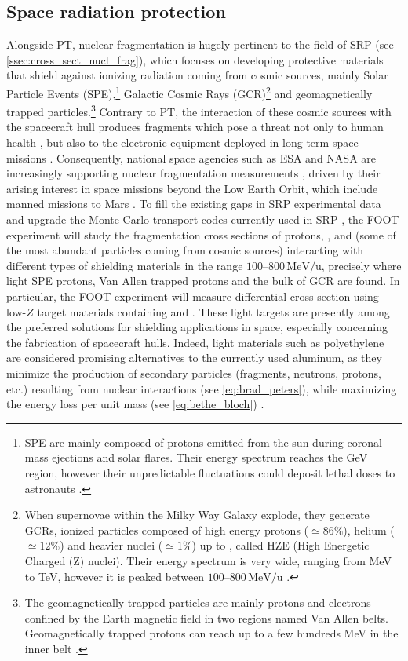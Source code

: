 \subsection{Space radiation protection}\label{ssec:space_radiation_protection}
Alongside PT, nuclear fragmentation is hugely pertinent to the field of SRP (see \autoref{ssec:cross_sect_nucl_frag}), which focuses on developing protective materials that shield against ionizing radiation coming from cosmic sources, mainly Solar Particle Events (SPE),\footnote{SPE are mainly composed of protons emitted from the sun during coronal mass ejections and solar flares. Their energy spectrum reaches the GeV region, however their unpredictable fluctuations could deposit lethal doses to astronauts \cite{measurement_impact_foot}.} Galactic Cosmic Rays (GCR)\footnote{When supernovae within the Milky Way Galaxy explode, they generate GCRs, ionized particles composed of high energy protons ($\simeq86\%$), helium ($\simeq12\%$) and heavier nuclei ($\simeq1\%$) up to , called HZE (High Energetic Charged (Z) nuclei). Their energy spectrum is very wide, ranging from MeV to TeV, however it is peaked between $100$--$800\,\mathrm{MeV/u}$ \cite{measurement_impact_foot}.} and geomagnetically trapped particles.\footnote{The geomagnetically trapped particles are mainly protons and electrons confined by the Earth magnetic field in two regions named Van Allen belts. Geomagnetically trapped protons can reach up to a few hundreds MeV in the inner belt \cite{measurement_impact_foot}.} Contrary to PT, the interaction of these cosmic sources with the spacecraft hull produces fragments which pose a threat not only to human health \cite{articleSustainableSpaceExploration}, but also to the electronic equipment deployed in long-term space missions \cite{RevModPhys.83.1245,wrbanek2020spaceradiation}. Consequently, national space agencies such as ESA and NASA are increasingly supporting nuclear fragmentation measurements \cite{Luoni2025}, driven by their arising interest in space missions beyond the Low Earth Orbit, which include manned missions to Mars \cite{DURANTE20142}. To fill the existing gaps in SRP experimental data \cite{Norbury2012} and upgrade the Monte Carlo transport codes currently used in SRP \cite{HEINBOCKEL20111079}, the FOOT experiment will study the fragmentation cross sections of protons, ,  and  (some of the most abundant particles coming from cosmic sources) interacting with different types of shielding materials in the range $100$--$800\,\mathrm{MeV/u}$, precisely where light SPE protons, Van Allen trapped protons and the bulk of GCR are found. In particular, the FOOT experiment will measure differential cross section using low-$Z$ target materials containing  and . These light targets are presently among the preferred solutions for shielding applications in space, especially concerning the fabrication of spacecraft hulls. Indeed, light materials such as polyethylene are considered promising alternatives to the currently used aluminum, as they minimize the production of secondary particles (fragments, neutrons, protons, etc.) resulting from nuclear interactions (see \autoref{eq:brad_peters}), while maximizing the energy loss per unit mass (see \autoref{eq:bethe_bloch}) \cite{articleShielding,Rizzo2023-ol,SLABA20171}.
